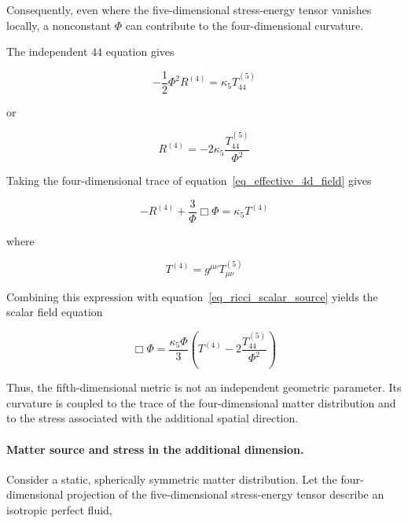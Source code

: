\documentclass[pdflatex,sn-mathphys-num]{sn-jnl}%
\theoremstyle{thmstyleone}%
\theoremstyle{thmstyletwo}%
\theoremstyle{thmstylethree}%
\begin{document}
Consequently, even where the five-dimensional stress-energy tensor vanishes locally, a nonconstant $\Phi$ can contribute to the four-dimensional curvature.

The independent $44$ equation gives

\begin{equation}
    -\frac{1}{2}\Phi^2R^{(4)}
    =
    \kappa_5T_{44}^{(5)}
\end{equation}

or

\begin{equation}
    \boxed{
    R^{(4)}
    =
    -2\kappa_5
    \frac{T_{44}^{(5)}}{\Phi^2}
    }
    \label{eq_ricci_scalar_source}
\end{equation}

Taking the four-dimensional trace of equation~\eqref{eq_effective_4d_field} gives

\begin{equation}
    -R^{(4)}
    +
    \frac{3}{\Phi}\Box\Phi
    =
    \kappa_5T^{(4)}
\end{equation}

where

\begin{equation}
    T^{(4)}
    =
    g^{\mu\nu}T_{\mu\nu}^{(5)}
\end{equation}

Combining this expression with equation~\eqref{eq_ricci_scalar_source} yields the scalar field equation

\begin{equation}
    \boxed{
    \Box\Phi
    =
    \frac{\kappa_5\Phi}{3}
    \left(
        T^{(4)}
        -
        2\frac{T_{44}^{(5)}}{\Phi^2}
    \right)
    }
    \label{eq_sourced_scalar_field}
\end{equation}

Thus, the fifth-dimensional metric is not an independent geometric parameter. Its curvature is coupled to the trace of the four-dimensional matter distribution and to the stress associated with the additional spatial direction.

\paragraph{Matter source and stress in the additional dimension.}

Consider a static, spherically symmetric matter distribution. Let the four-dimensional projection of the five-dimensional stress-energy tensor describe an isotropic perfect fluid,
\end{document}
